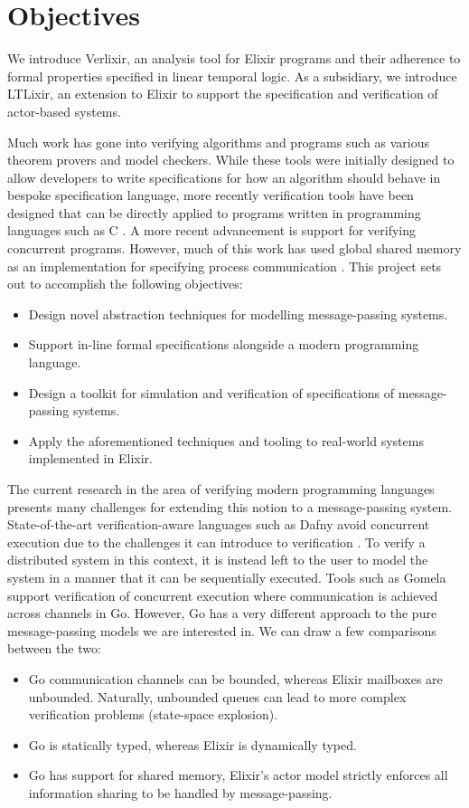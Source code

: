 \section{Objectives}
We introduce Verlixir, an analysis tool for Elixir programs and their adherence to formal properties specified in linear temporal logic. As a subsidiary, we introduce LTLixir, an extension to Elixir to support the specification and verification of actor-based systems. 
\par
Much work has gone into verifying algorithms and programs such as various theorem provers and model checkers. While these tools were initially designed to allow developers to write specifications for how an algorithm should behave in bespoke specification language, more recently verification tools have been designed that can be directly applied to programs written in programming languages such as C \cite{c_to_promela}. A more recent advancement is support for verifying concurrent programs. However, much of this work has used global shared memory as an implementation for specifying process communication \cite{java_pathfinder}. This project sets out to accomplish the following objectives:
\begin{itemize}
    \item Design novel abstraction techniques for modelling message-passing systems.
    \item Support in-line formal specifications alongside a modern programming language.
    \item Design a toolkit for simulation and verification of specifications of message-passing systems.
    \item Apply the aforementioned techniques and tooling to real-world systems implemented in Elixir.
\end{itemize}
The current research in the area of verifying modern programming languages presents many challenges for extending this notion to a message-passing system. State-of-the-art verification-aware languages such as Dafny avoid concurrent execution due to the challenges it can introduce to verification \cite{dafny_concurrency}. To verify a distributed system in this context, it is instead left to the user to model the system in a manner that it can be sequentially executed. Tools such as Gomela \cite{gomela} support verification of concurrent execution where communication is achieved across channels in Go. However, Go has a very different approach to the pure message-passing models we are interested in. We can draw a few comparisons between the two:
\begin{itemize}
    \item Go communication channels can be bounded, whereas Elixir mailboxes are unbounded. Naturally, unbounded queues can lead to more complex verification problems (state-space explosion).
    \item Go is statically typed, whereas Elixir is dynamically typed.
    \item Go has support for shared memory, Elixir's actor model strictly enforces all information sharing to be handled by message-passing.
\end{itemize}
